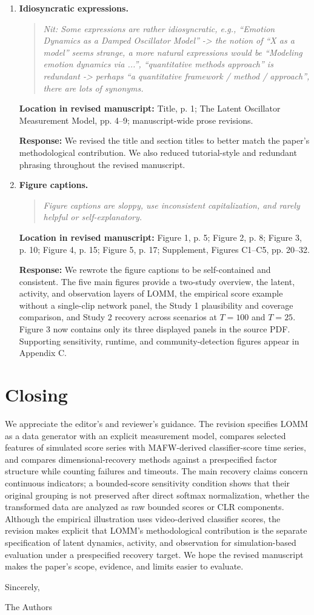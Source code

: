 \documentclass[11pt]{article}
\newenvironment{reviewquote}{\begin{quote}\small\itshape}{\end{quote}}
\newcommand{\point}[1]{\textbf{#1.}}
\newcommand{\location}[1]{\textbf{Location in revised manuscript:} #1\par}
\newcommand{\response}{\textbf{Response:} }
\begin{document}
\begin{enumerate}
  \item \point{Idiosyncratic expressions}
  \begin{reviewquote}
  Nit: Some expressions are rather idiosyncratic, e.g., ``Emotion Dynamics as a Damped Oscillator Model'' -> the notion of ``X as a model'' seems strange, a more natural expressions would be ``Modeling emotion dynamics via ...'', ``quantitative methods approach'' is redundant -> perhaps ``a quantitative framework / method / approach'', there are lots of synonyms.
  \end{reviewquote}
  \location{Title, p. 1; The Latent Oscillator Measurement Model, pp. 4--9; manuscript-wide prose revisions.}
  \response We revised the title and section titles to better match the paper's methodological contribution. We also reduced tutorial-style and redundant phrasing throughout the revised manuscript.

  \item \point{Figure captions}
  \begin{reviewquote}
  Figure captions are sloppy, use inconsistent capitalization, and rarely helpful or self-explanatory.
  \end{reviewquote}
  \location{Figure 1, p. 5; Figure 2, p. 8; Figure 3, p. 10; Figure 4, p. 15; Figure 5, p. 17; Supplement, Figures C1--C5, pp. 20--32.}
  \response We rewrote the figure captions to be self-contained and consistent. The five main figures provide a two-study overview, the latent, activity, and observation layers of LOMM, the empirical score example without a single-clip network panel, the Study 1 plausibility and coverage comparison, and Study 2 recovery across scenarios at $T=100$ and $T=25$. Figure 3 now contains only its three displayed panels in the source PDF. Supporting sensitivity, runtime, and community-detection figures appear in Appendix C.
\end{enumerate}

\section*{Closing}

We appreciate the editor's and reviewer's guidance. The revision specifies LOMM as a data generator with an explicit measurement model, compares selected features of simulated score series with MAFW-derived classifier-score time series, and compares dimensional-recovery methods against a prespecified factor structure while counting failures and timeouts. The main recovery claims concern continuous indicators; a bounded-score sensitivity condition shows that their original grouping is not preserved after direct softmax normalization, whether the transformed data are analyzed as raw bounded scores or CLR components. Although the empirical illustration uses video-derived classifier scores, the revision makes explicit that LOMM's methodological contribution is the separate specification of latent dynamics, activity, and observation for simulation-based evaluation under a prespecified recovery target. We hope the revised manuscript makes the paper's scope, evidence, and limits easier to evaluate.

Sincerely,

The Authors
\end{document}
